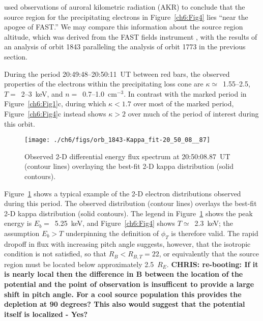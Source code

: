   \citet{Ergun1998} used observations of auroral kilometric radiation (AKR) to
  conclude that the source region for the precipitating electrons in
  Figure~\ref{ch6:Fig4} lies ``near the apogee of FAST.''  We may compare this
  information about the source region altitude, which was derived from the FAST
  fields instrument \citep{Ergun2001}, with the results of an analysis of orbit
  1843 paralleling the analysis of orbit 1773 in the previous section.

  During the period 20:49:48--20:50:11~UT between red bars, the observed
  properties of the electrons within the precipitating loss cone are $\kappa
  \simeq $~1.55--2.5, $T =$~2--3~keV, and $n =$~0.7--1.0~cm$^{-3}$. In contrast
  with the marked period in Figure~\ref{ch6:Fig1}c, during which $\kappa < 1.7$
  over most of the marked period, Figure~\ref{ch6:Fig4}c instead shows $\kappa >
  2$ over much of the period of interest during this orbit.


  \begin{figure}
    \centering
    \noindent\texttt{[image: ./ch6/figs/orb\_1843-Kappa\_fit-20\_50\_08\_\_87]}
    \caption[Example two-dimensional fit of inverted V precipitation (Orbit
    1843)]{Observed 2-D differential energy flux spectrum at 20:50:08.87~UT
      (contour lines) overlaying the best-fit 2-D kappa distribution (solid
      contours).}
    \label{ch6:Fig5}
  \end{figure}


  Figure~\ref{ch6:Fig5} shows a typical example of the 2-D electron
  distributions observed during this period. The observed distribution (contour
  lines) overlays the best-fit 2-D kappa distribution (solid contours). The
  legend in Figure~\ref{ch6:Fig5} shows the peak energy is $E_b =$~5.25~keV, and
  Figure~\ref{ch6:Fig4} shows $T \simeq$~2.3~keV; the assumption $E_b > T$
  underpinning the definition of $\phi_T$ is therefore valid. The rapid dropoff
  in flux with increasing pitch angle suggests, however, that the isotropic
  condition is not satisfied, so that $R_B < R_{B,T} = 22$, or equivalently that
  the source region must be located below approximately
  2.5~$R_E$. \textbf{CHRIS: re-booting: If it is nearly local then the
    difference in B between the location of the potential and the point of
    observation is insufficent to provide a large shift in pitch angle. For a
    cool source population this provides the depletion at 90 degrees? This also
    would suggest that the potential itself is localized - Yes?}


